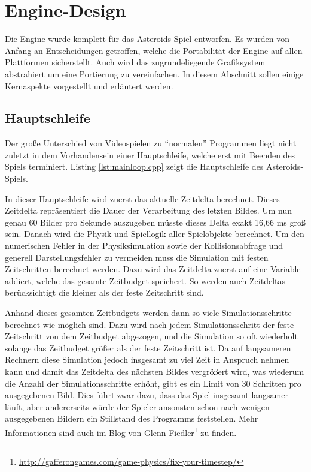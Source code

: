\documentclass[12pt, a4paper, titlepage, hidelinks]{scrreprt}
\begin{document}
\section{Engine-Design}

Die Engine wurde komplett für das Asteroids-Spiel entworfen. Es wurden von Anfang an Entscheidungen getroffen, welche die Portabilität der Engine auf allen Plattformen sicherstellt. Auch wird das zugrundeliegende Grafiksystem abstrahiert um eine Portierung zu vereinfachen. In diesem Abschnitt sollen einige Kernaspekte vorgestellt und erläutert werden. 

\subsection{Hauptschleife}

Der große Unterschied von Videospielen zu ``normalen'' Programmen liegt nicht zuletzt in dem Vorhandensein einer Hauptschleife, welche erst mit Beenden des Spiels terminiert. Listing \autoref{lst:mainloop.cpp} zeigt die Hauptschleife des Asteroids-Spiels.

In dieser Hauptschleife wird zuerst das aktuelle Zeitdelta berechnet. Dieses Zeitdelta repräsentiert die Dauer der Verarbeitung des letzten Bildes. Um nun genau 60 Bilder pro Sekunde auszugeben müsste dieses Delta exakt 16,66 ms groß sein. Danach wird die Physik und Spiellogik aller Spielobjekte berechnet. Um den numerischen Fehler in der Physiksimulation sowie der Kollisionsabfrage und generell Darstellungsfehler zu vermeiden muss die Simulation mit festen Zeitschritten berechnet werden. Dazu wird das Zeitdelta zuerst auf eine Variable addiert, welche das gesamte Zeitbudget speichert. So werden auch Zeitdeltas berücksichtigt die kleiner als der feste Zeitschritt sind.

Anhand dieses gesamten Zeitbudgets werden dann so viele Simulationsschritte berechnet wie möglich sind. Dazu wird nach jedem Simulationsschritt der feste Zeitschritt von dem Zeitbudget abgezogen, und die Simulation so oft wiederholt solange das Zeitbudget größer als der feste Zeitschritt ist. Da auf langsameren Rechnern diese Simulation jedoch insgesamt zu viel Zeit in Anspruch nehmen kann und damit das Zeitdelta des nächsten Bildes vergrößert wird, was wiederum die Anzahl der Simulationsschritte erhöht, gibt es ein Limit von 30 Schritten pro ausgegebenen Bild. Dies führt zwar dazu, dass das Spiel insgesamt langsamer läuft, aber andererseits würde der Spieler ansonsten schon nach wenigen ausgegebenen Bildern ein Stillstand des Programms feststellen. Mehr Informationen sind auch im Blog von Glenn Fiedler\footnote{\url{http://gafferongames.com/game-physics/fix-your-timestep/}} zu finden.
\end{document}
